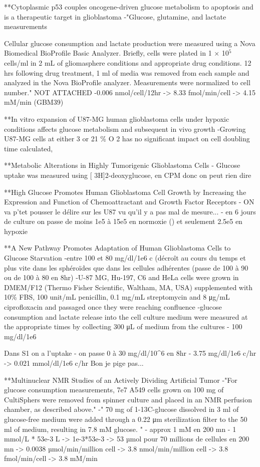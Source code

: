 \documentclass[11pt,a4paper]{article}
\begin{document}
**Cytoplasmic p53 couples oncogene-driven glucose metabolism to apoptosis and is a therapeutic target in glioblastoma
-"Glucose, glutamine, and lactate measurements

Cellular glucose consumption and lactate production were measured using a Nova Biomedical BioProfile Basic Analyzer. Briefly, cells were plated in 1 × 10$^5$ cells/ml in 2 mL of gliomasphere conditions and appropriate drug conditions. 12 hrs following drug treatment, 1 ml of media was removed from each sample and analyzed in the Nova BioProfile analyzer. Measurements were normalized to cell number." NOT ATTACHED
-0.006 nmol/cell/12hr -> 8.33 fmol/min/cell -> 4.15 mM/min (GBM39)

**In vitro expansion of U87-MG human glioblastoma cells under hypoxic conditions affects glucose metabolism and subsequent in vivo growth
-Growing U87-MG cells at either 3 or 21 \% O 2 has no
significant impact on cell doubling time calculated,


**Metabolic Alterations in Highly Tumorigenic Glioblastoma
Cells
- Glucose uptake was measured using [ 3H]2-deoxyglucose,
 en CPM donc on peut rien dire
 
 **High Glucose Promotes Human Glioblastoma Cell Growth by Increasing the Expression and Function of Chemoattractant and Growth Factor Receptors
- ON va p'tet pousser le délire sur les U87 vu qu'il y a pas mal de mesure...
- en 6 jours de culture on passe de moins 1e5 à 15e5 en normoxie () et seulement 2.5e5 en hypoxie

**A New Pathway Promotes Adaptation of Human Glioblastoma Cells to Glucose Starvation
-entre 100 et 80 mg/dl/1e6 c (décroît au cours du temps et plus vite dans les sphéroïdes que dans les cellules adhérentes (passe de 100 à 90 ou de 100 à 80 en 8hr)
-U-87 MG, Hu-197, C6 and HeLa cells were grown in DMEM/F12 (Thermo Fisher Scientific, Waltham, MA, USA) supplemented with 10\% FBS, 100 unit/mL penicillin, 0.1 mg/mL streptomycin and 8 μg/mL ciprofloxacin and passaged once they were reaching confluence
-glucose consumption and lactate release into the cell culture medium were measured at the appropriate times by collecting 300 μL of medium from the cultures
- 100 mg/dl/1e6

Dans S1 on a l'uptake 
- on passe 0 à 30 mg/dl/10^6 en 8hr
- 3.75 mg/dl/1e6 c/hr ->  0.021 mmol/dl/1e6 c/hr
Bon je pige pas...


**Multinuclear NMR Studies of an Actively Dividing Artificial
Tumor
-"For glucose consumption measurements, 7e7 A549 cells grown on 100 mg of CultiSphers were removed from spinner culture and placed in an NMR perfusion chamber, as described above."
-" 70 mg of 1-13C-glucose dissolved in 3 ml of glucose-free medium were added
through a 0.22 μm sterilization filter to the 50 ml of medium, resulting in 7.8 mM glucose. " 
- approx 1 mM en 200 mn
- 1 mmol/L * 53e-3 L -> 1e-3*53e-3 -> 53 µmol pour 70 millions de cellules en 200 mn -> 0.0038 µmol/min/million cell -> 3.8 nmol/min/million cell -> 3.8 fmol/min/cell -> 3.8 mM/min
\end{document}
